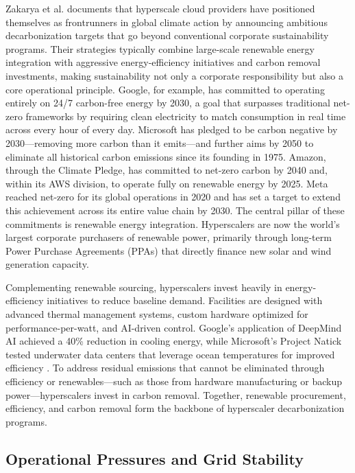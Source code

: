 \documentclass[conference]{IEEEtran}
\begin{document}
Zakarya et al. \cite{Zakarya2024} documents that hyperscale cloud providers have positioned themselves as frontrunners in global climate action by announcing ambitious decarbonization targets that go beyond conventional corporate sustainability programs. Their strategies typically combine large-scale renewable energy integration with aggressive energy-efficiency initiatives and carbon removal investments, making sustainability not only a corporate responsibility but also a core operational principle. Google, for example, has committed to operating entirely on 24/7 carbon-free energy by 2030, a goal that surpasses traditional net-zero frameworks by requiring clean electricity to match consumption in real time across every hour of every day. Microsoft has pledged to be carbon negative by 2030---removing more carbon than it emits---and further aims by 2050 to eliminate all historical carbon emissions since its founding in 1975. Amazon, through the Climate Pledge, has committed to net-zero carbon by 2040 and, within its AWS division, to operate fully on renewable energy by 2025. Meta reached net-zero for its global operations in 2020 and has set a target to extend this achievement across its entire value chain by 2030. The central pillar of these commitments is renewable energy integration. Hyperscalers are now the world's largest corporate purchasers of renewable power, primarily through long-term Power Purchase Agreements (PPAs) that directly finance new solar and wind generation capacity.

Complementing renewable sourcing, hyperscalers invest heavily in energy-efficiency initiatives to reduce baseline demand. Facilities are designed with advanced thermal management systems, custom hardware optimized for performance-per-watt, and AI-driven control. Google's application of DeepMind AI achieved a 40\% reduction in cooling energy, while Microsoft's Project Natick tested underwater data centers that leverage ocean temperatures for improved efficiency \cite{Zakarya2024}. To address residual emissions that cannot be eliminated through efficiency or renewables---such as those from hardware manufacturing or backup power---hyperscalers invest in carbon removal. Together, renewable procurement, efficiency, and carbon removal form the backbone of hyperscaler decarbonization programs.

\subsection{Operational Pressures and Grid Stability}
\end{document}
